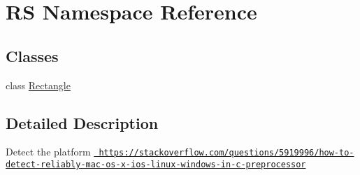 \hypertarget{namespace_r_s}{}\section{RS Namespace Reference}
\label{namespace_r_s}
\subsection*{Classes}
\begin{DoxyCompactItemize}
\item 
class \mbox{\hyperlink{class_r_s_1_1_rectangle}{Rectangle}}
\end{DoxyCompactItemize}


\subsection{Detailed Description}
Detect the platform \href{https://stackoverflow.com/questions/5919996/how-to-detect-reliably-mac-os-x-ios-linux-windows-in-c-preprocessor}{\texttt{ https\+://stackoverflow.\+com/questions/5919996/how-\/to-\/detect-\/reliably-\/mac-\/os-\/x-\/ios-\/linux-\/windows-\/in-\/c-\/preprocessor}} 
